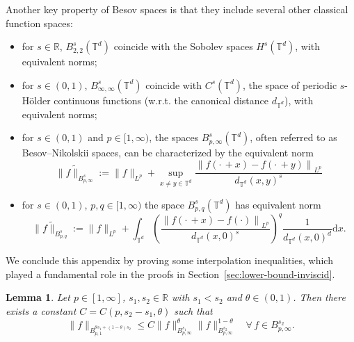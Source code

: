 \documentclass[11pt,oneside,reqno]{amsart}
\newcommand{\assign}{:=}
\newcommand{\mathd}{\mathrm{d}}
\newtheorem{lemma}[theorem]{Lemma}
\numberwithin{equation}{section}
\begin{document}
Another key property of Besov spaces is that they include several other
classical function spaces:
\begin{itemize}
  \item for $s \in \mathbb{R}$, $B^s_{2, 2} (\mathbb{T}^d)$ coincide with the
  Sobolev spaces $H^s (\mathbb{T}^d)$, with equivalent norms;
  
  \item for $s \in (0, 1)$, $B^s_{\infty, \infty} (\mathbb{T}^d)$ coincide
  with $C^s (\mathbb{T}^d)$, the space of periodic $s$-H\"{o}lder continuous
  functions (w.r.t. the canonical distance $d_{\mathbb{T}^d}$), with
  equivalent norms;
  
  \item for $s \in (0, 1)$ and $p \in [1, \infty)$, the spaces $B^s_{p,
  \infty} (\mathbb{T}^d)$, often referred to as Besov--Nikolskii spaces, can
  be characterized by the equivalent norm
  \begin{equation}\label{eq:besov-equiv-norm-1}
  	\|f \tilde{\|}_{B^s_{p, \infty}} \assign \| f \|_{L^p} + \sup_{x \neq y
     \in \mathbb{T}^d} \frac{\left\| f \left( \cdot \, + x \right) - f \left(
     \cdot \, + y \right) \right\|_{L^p}}{d_{\mathbb{T}^d} (x, y)^s}
  \end{equation}
  \item for $s \in (0, 1)$, $p, q \in [1, \infty)$ the space $B^s_{p, q}
  (\mathbb{T}^d)$ has equivalent norm
  \begin{equation}\label{eq:besov-equiv-norm-2}
  \|f \tilde{\|}_{B^s_{p, q}} \assign \| f \|_{L^p} + \int_{\mathbb{T}^d}
     \left( \frac{\left\| f \left( \cdot \, + x \right) - f (\cdot)
     \right\|_{L^p}}{d_{\mathbb{T}^d} (x, 0)^s} \right)^q 
     \frac{1}{d_{\mathbb{T}^d} (x, 0)^d} \mathd x.
  \end{equation}
\end{itemize}


We conclude this appendix by proving some interpolation inequalities, which
played a fundamental role in the proofs in
Section~\ref{sec:lower-bound-inviscid}.

\begin{lemma}
  \label{lem:interpolation-besov}Let $p \in [1, \infty]$, $s_1, s_2 \in
  \mathbb{R}$ with $s_1 < s_2$ and $\theta \in (0, 1)$. Then there exists a
  constant $C = C (p, s_2 - s_1, \theta)$ such that
  \begin{equation}
    \| f \|_{B^{\theta s_1 + (1 - \theta) s_2}_{p, 1}} \leqslant C \| f
    \|_{B^{s_1}_{p, \infty}}^{\theta}  \| f \|^{1 - \theta}_{B^{s_2}_{p,
    \infty}}  \quad \forall \, f \in B^{s_2}_{p, \infty} .
    \label{eq:interpolation-besov}
  \end{equation}
\end{lemma}
\end{document}
